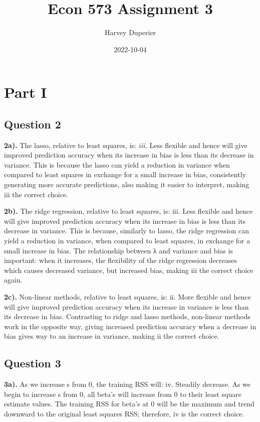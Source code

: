 \documentclass[
]{article}
\title{Econ 573 Assignment 3}
\author{Harvey Duperier}
\date{2022-10-04}
\begin{document}
\maketitle

\hypertarget{part-i}{%
\section{Part I}\label{part-i}}

\hypertarget{question-2}{%
\subsection{Question 2}\label{question-2}}

\textbf{2a).} The lasso, relative to least squares, is: \emph{iii.} Less
flexible and hence will give improved prediction accuracy when its
increase in bias is less than its decrease in variance. This is because
the lasso can yield a reduction in variance when compared to least
squares in exchange for a small increase in bias, consistently
generating more accurate predictions, also making it easier to
interpret, making iii the correct choice.

\textbf{2b).} The ridge regression, relative to least squares, is: iii.
Less flexible and hence will give improved prediction accuracy when its
increase in bias is less than its decrease in variance. This is because,
similarly to lasso, the ridge regression can yield a reduction in
variance, when compared to least squares, in exchange for a small
increase in bias. The relationship between λ and variance and bias is
important: when it increases, the flexibility of the ridge regression
decreases which causes decreased variance, but increased bias, making
iii the correct choice again.

\textbf{2c).} Non-linear methods, relative to least squares, is: ii.
More flexible and hence will give improved prediction accuracy when its
increase in variance is less than its decrease in bias. Contrasting to
ridge and lasso methods, non-linear methods work in the opposite way,
giving increased prediction accuracy when a decrease in bias gives way
to an increase in variance, making ii the correct choice.

\hypertarget{question-3}{%
\subsection{Question 3}\label{question-3}}

\textbf{3a).} As we increase s from 0, the training RSS will: iv.
Steadily decrease. As we begin to increase s from 0, all beta's will
increase from 0 to their least square estimate values. The training RSS
for beta's at 0 will be the maximum and trend downward to the original
least squares RSS; therefore, iv is the correct choice.
\end{document}
